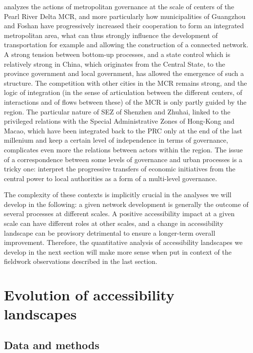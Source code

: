 \documentclass[11pt]{article}
\begin{document}
\cite{Ye2014200} analyzes the actions of metropolitan governance at the scale of centers of the Pearl River Delta MCR, and more particularly how municipalities of Guangzhou and Foshan have progressively increased their cooperation to form an integrated metropolitan area, what can thus strongly influence the development of transportation for example and allowing the construction of a connected network. A strong tension between bottom-up processes, and a state control which is relatively strong in China, which originates from the Central State, to the province government and local government, has allowed the emergence of such a structure. The competition with other cities in the MCR remains strong, and the logic of integration (in the sense of articulation between the different centers, of interactions and of flows between these) of the MCR is only partly guided by the region. The particular nature of SEZ of Shenzhen and Zhuhai, linked to the privileged relations with the Special Administrative Zones of Hong-Kong and Macao, which have been integrated back to the PRC only at the end of the last millenium and keep a certain level of independence in terms of governance, complicates even more the relations between actors within the region. The issue of a correspondence between some levels of governance and urban processes is a tricky one: \cite{liao2017ouverture} interpret the progressive transfers of economic initiatives from the central power to local authorities as a form of a multi-level governance.


The complexity of these contexts is implicitly crucial in the analyses we will develop in the following: a given network development is generally the outcome of several processes at different scales. A positive accessibility impact at a given scale can have different roles at other scales, and a change in accessibility landscape can be provisory detrimental to ensure a longer-term overall improvement. Therefore, the quantitative analysis of accessibility landscapes we develop in the next section will make more sense when put in context of the fieldwork observations described in the last section.



\section{Evolution of accessibility landscapes}


\subsection{Data and methods}
\end{document}
